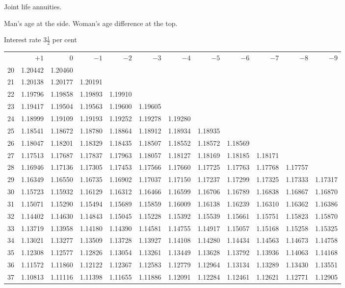 \clearpage
{}
\begin{center}
Joint life annuities.\par\smallskip
Man's age at the side. Woman's age difference at the top.\par\smallskip
Interest rate \(3\tfrac{1}{2}\) per cent\par\medskip
\fontsize{8}{10}\selectfont\setlength{\tabcolsep}{1.3pt}
\begin{tabular}{|r|rrrrrrrrrrr|}
\hline
&\(+1\)&0&\(-1\)&\(-2\)&\(-3\)&\(-4\)&\(-5\)&\(-6\)&\(-7\)&\(-8\)&\(-9\)\\[8pt]
20&1.20442&1.20460&&&&&&&&&\\
21&1.20138&1.20177&1.20191&&&&&&&&\\
22&1.19796&1.19858&1.19893&1.19910&&&&&&&\\
23&1.19417&1.19504&1.19563&1.19600&1.19605&&&&&&\\
24&1.18999&1.19109&1.19193&1.19252&1.19278&1.19280&&&&&\\[5pt]
25&1.18541&1.18672&1.18780&1.18864&1.18912&1.18934&1.18935&&&&\\
26&1.18047&1.18201&1.18329&1.18435&1.18507&1.18552&1.18572&1.18569&&&\\
27&1.17513&1.17687&1.17837&1.17963&1.18057&1.18127&1.18169&1.18185&1.18171&&\\
28&1.16946&1.17136&1.17305&1.17453&1.17566&1.17660&1.17725&1.17763&1.17768&1.17757&\\
29&1.16349&1.16550&1.16735&1.16902&1.17037&1.17150&1.17237&1.17299&1.17325&1.17333&1.17317\\[5pt]
30&1.15723&1.15932&1.16129&1.16312&1.16466&1.16599&1.16706&1.16789&1.16838&1.16867&1.16870\\
31&1.15071&1.15290&1.15494&1.15689&1.15859&1.16009&1.16138&1.16239&1.16310&1.16362&1.16386\\
32&1.14402&1.14630&1.14843&1.15045&1.15228&1.15392&1.15539&1.15661&1.15751&1.15823&1.15870\\
33&1.13719&1.13958&1.14180&1.14390&1.14581&1.14755&1.14917&1.15057&1.15168&1.15258&1.15325\\
34&1.13021&1.13277&1.13509&1.13728&1.13927&1.14108&1.14280&1.14434&1.14563&1.14673&1.14758\\[5pt]
35&1.12308&1.12577&1.12826&1.13054&1.13261&1.13449&1.13628&1.13792&1.13936&1.14063&1.14168\\
36&1.11572&1.11860&1.12122&1.12367&1.12583&1.12779&1.12964&1.13134&1.13289&1.13430&1.13551\\
37&1.10813&1.11116&1.11398&1.11655&1.11886&1.12091&1.12284&1.12461&1.12621&1.12771&1.12905\\

\end{tabular}
\end{center}
